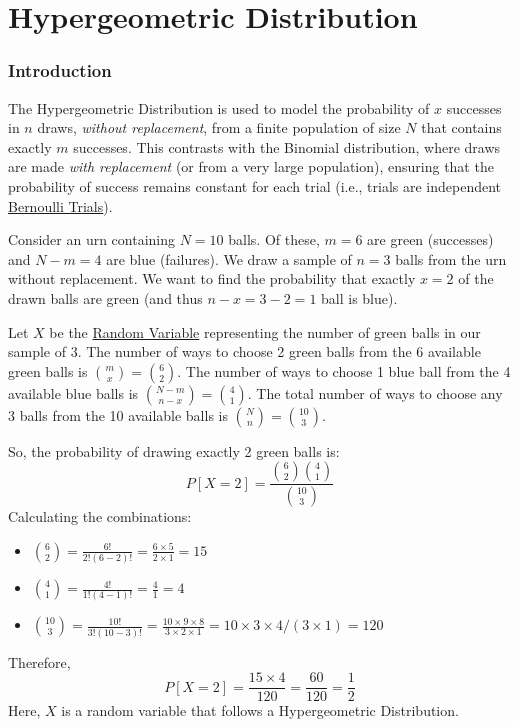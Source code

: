 \chapter{Hypergeometric Distribution}
\label{chap:hypergeometric-distribution}

\subsection{Introduction}
\label{ssec:introduction-hypergeometric-distribution}

The Hypergeometric Distribution is used to model the probability of \(x\)
successes in \(n\) draws, \textit{without replacement}, from a finite population
of size \(N\) that contains exactly \(m\) successes. This contrasts with the
Binomial distribution, where draws are made \textit{with replacement} (or from a
very large population), ensuring that the probability of success remains
constant for each trial (i.e., trials are independent
\href{def:bernoulli-process}{Bernoulli Trials}).

\begin{eg}
  Consider an urn containing \(N=10\) balls. Of these, \(m=6\) are green
  (successes) and \(N-m=4\) are blue (failures).
  We draw a sample of \(n=3\) balls from the urn without replacement.
  We want to find the probability that exactly \(x=2\) of the drawn balls are
  green (and thus \(n-x = 3-2=1\) ball is blue).

  Let \(X\) be the \href{def:random-variable}{Random Variable} representing the
  number of green balls in our sample of 3.
  The number of ways to choose 2 green balls from the 6 available green balls is
  \(\binom{m}{x} = \binom{6}{2}\).
  The number of ways to choose 1 blue ball from the 4 available blue balls is
  \(\binom{N-m}{n-x} = \binom{4}{1}\).
  The total number of ways to choose any 3 balls from the 10 available balls is
  \(\binom{N}{n} = \binom{10}{3}\).

  So, the probability of drawing exactly 2 green balls is:
  \[ P[X=2] = \frac{\binom{6}{2} \binom{4}{1}}{\binom{10}{3}} \]
  Calculating the combinations:
  \begin{itemize}
    \item \(\binom{6}{2} = \frac{6!}{2!(6-2)!} = \frac{6 \times 5}{2 \times 1} = 15\)
    \item \(\binom{4}{1} = \frac{4!}{1!(4-1)!} = \frac{4}{1} = 4\)
    \item \(\binom{10}{3} = \frac{10!}{3!(10-3)!} = \frac{10 \times 9 \times 8}{3 \times 2 \times 1} = 10 \times 3 \times 4 / (3 \times 1) = 120\)
  \end{itemize}
  Therefore,
  \[ P[X=2] = \frac{15 \times 4}{120} = \frac{60}{120} = \frac{1}{2} \]
  Here, \(X\) is a random variable that follows a Hypergeometric Distribution.
\end{eg}


